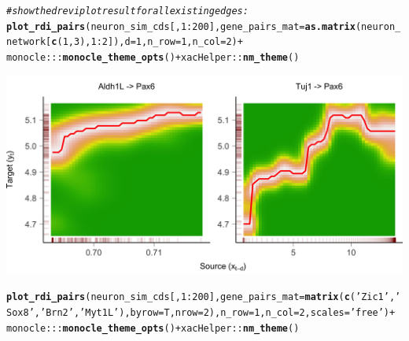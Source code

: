 \documentclass[10pt,oneside]{article}\usepackage[]{graphicx}\usepackage[]{color}
\makeatletter
\def\maxwidth{ %
  \ifdim\Gin@nat@width>\linewidth
    \linewidth
  \else
    \Gin@nat@width
  \fi
}
\newcommand{\hlnum}[1]{\textcolor[rgb]{0.686,0.059,0.569}{#1}}%
\newcommand{\hlstr}[1]{\textcolor[rgb]{0.192,0.494,0.8}{#1}}%
\newcommand{\hlcom}[1]{\textcolor[rgb]{0.678,0.584,0.686}{\textit{#1}}}%
\newcommand{\hlopt}[1]{\textcolor[rgb]{0,0,0}{#1}}%
\newcommand{\hlstd}[1]{\textcolor[rgb]{0.345,0.345,0.345}{#1}}%
\newcommand{\hlkwc}[1]{\textcolor[rgb]{0.333,0.667,0.333}{#1}}%
\newcommand{\hlkwd}[1]{\textcolor[rgb]{0.737,0.353,0.396}{\textbf{#1}}}%
\newenvironment{kframe}{%
 \def\at@end@of@kframe{}%
 \ifinner\ifhmode%
  \def\at@end@of@kframe{\end{minipage}}%
  \begin{minipage}{\columnwidth}%
 \fi\fi%
 \def\FrameCommand##1{\hskip\@totalleftmargin \hskip-\fboxsep
 \colorbox{shadecolor}{##1}\hskip-\fboxsep
     \hskip-\linewidth \hskip-\@totalleftmargin \hskip\columnwidth}%
 \MakeFramed {\advance\hsize-\width
   \@totalleftmargin\z@ \linewidth\hsize
   \@setminipage}}%
 {\par\unskip\endMakeFramed%
 \at@end@of@kframe}
\newenvironment{knitrout}{}{} %
\makeatother
\begin{document}
\begin{knitrout}
\color{fgcolor}\begin{kframe}
\begin{alltt}
\hlcom{# show the drevi plot result for all existing edges:}
\hlkwd{plot_rdi_pairs}\hlstd{(neuron_sim_cds[,} \hlnum{1}\hlopt{:}\hlnum{200}\hlstd{],} \hlkwc{gene_pairs_mat} \hlstd{=} \hlkwd{as.matrix}\hlstd{(neuron_network[}\hlkwd{c}\hlstd{(}\hlnum{1}\hlstd{,} \hlnum{3}\hlstd{),} \hlnum{1}\hlopt{:}\hlnum{2}\hlstd{]),} \hlkwc{d} \hlstd{=} \hlnum{1}\hlstd{,} \hlkwc{n_row} \hlstd{=} \hlnum{1}\hlstd{,} \hlkwc{n_col} \hlstd{=} \hlnum{2}\hlstd{)} \hlopt{+}
  \hlstd{monocle}\hlopt{:::}\hlkwd{monocle_theme_opts}\hlstd{()} \hlopt{+} \hlstd{xacHelper}\hlopt{::}\hlkwd{nm_theme}\hlstd{()}
\end{alltt}
\end{kframe}

{\centering \includegraphics[width=\maxwidth]{figure/plot_drevi-1} 

}


\begin{kframe}\begin{alltt}
\hlkwd{plot_rdi_pairs}\hlstd{(neuron_sim_cds[,} \hlnum{1}\hlopt{:}\hlnum{200}\hlstd{],} \hlkwc{gene_pairs_mat} \hlstd{=} \hlkwd{matrix}\hlstd{(}\hlkwd{c}\hlstd{(}\hlstr{'Zic1'}\hlstd{,} \hlstr{'Sox8'}\hlstd{,} \hlstr{'Brn2'}\hlstd{,} \hlstr{'Myt1L'}\hlstd{),} \hlkwc{byrow} \hlstd{= T,} \hlkwc{nrow} \hlstd{=} \hlnum{2}\hlstd{),} \hlkwc{n_row} \hlstd{=} \hlnum{1}\hlstd{,} \hlkwc{n_col} \hlstd{=} \hlnum{2}\hlstd{,} \hlkwc{scales} \hlstd{=} \hlstr{'free'}\hlstd{)} \hlopt{+}
  \hlstd{monocle}\hlopt{:::}\hlkwd{monocle_theme_opts}\hlstd{()} \hlopt{+} \hlstd{xacHelper}\hlopt{::}\hlkwd{nm_theme}\hlstd{()}
\end{alltt}
\end{kframe}


\end{knitrout}
\end{document}
